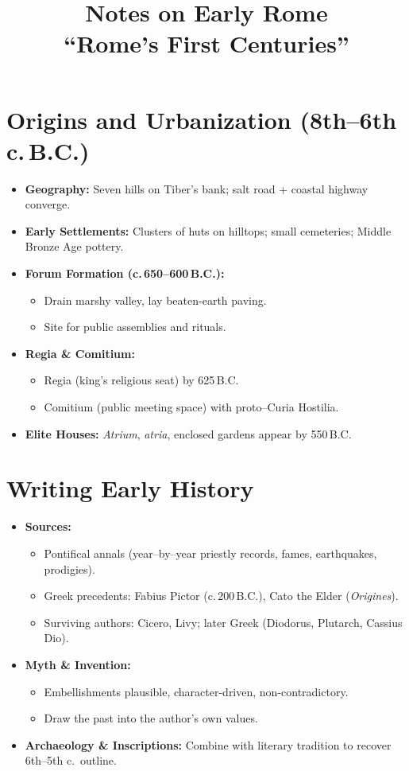 \documentclass[11pt,a4paper]{article}
\title{Notes on Early Rome \\ \small “Rome’s First Centuries”}
\author{}
\date{}
\begin{document}
\maketitle
\tableofcontents
\bigskip

\section[Origins and Urbanization (8th--6th c. B.C.)]{Origins and Urbanization (8th–6th c.\,B.C.)}
\begin{itemize}
  \item \textbf{Geography:} Seven hills on Tiber’s bank; salt road + coastal highway converge.
  \item \textbf{Early Settlements:} Clusters of huts on hilltops; small cemeteries; Middle Bronze Age pottery.
  \item \textbf{Forum Formation (c.\,650–600\,B.C.):}
    \begin{itemize}
      \item Drain marshy valley, lay beaten-earth paving.
      \item Site for public assemblies and rituals.
    \end{itemize}
  \item \textbf{Regia \& Comitium:} 
    \begin{itemize}
      \item Regia (king’s religious seat) by 625\,B.C.
      \item Comitium (public meeting space) with proto–Curia Hostilia.
    \end{itemize}
  \item \textbf{Elite Houses:} \textit{Atrium}, \textit{atria}, enclosed gardens appear by 550\,B.C.
\end{itemize}

\section{Writing Early History}
\begin{itemize}
  \item \textbf{Sources:} 
    \begin{itemize}
      \item Pontifical annals (year–by–year priestly records, fames, earthquakes, prodigies).
      \item Greek precedents: Fabius Pictor (c.\,200\,B.C.), Cato the Elder (\textit{Origines}).
      \item Surviving authors: Cicero, Livy; later Greek (Diodorus, Plutarch, Cassius Dio).
    \end{itemize}
  \item \textbf{Myth \& Invention:}
    \begin{itemize}
      \item Embellishments plausible, character-driven, non-contradictory.
      \item Draw the past into the author’s own values.
    \end{itemize}
  \item \textbf{Archaeology \& Inscriptions:} Combine with literary tradition to recover 6th–5th c.\ outline.
\end{itemize}
\end{document}
